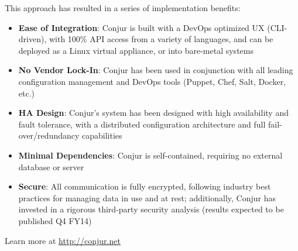 \documentclass[10pt, a5paper]{article}
\begin{document}
This approach has resulted in a series of implementation benefits: 
\begin{itemize}
\item {\bf Ease of Integration}: Conjur is built with a DevOps optimized UX (CLI-driven), with 100\% API access from a variety of langua\-ges, and can be deployed as a Linux virtual appliance, or into bare-metal systems 
\item {\bf No Vendor Lock-In}: Conjur has been used in conjunction with all leading configuration management and DevOps tools (Puppet, Chef, Salt, Docker, etc.) 
\item {\bf HA Design}: Conjur’s system has been designed with high availa\-bility and fault tolerance, with a distributed configuration archi\-tecture and full fail-over/redundancy capabilities 
\item {\bf Minimal Dependencies}: Conjur is self-contained, requiring no external database or server  
\item {\bf Secure}: All communication is fully encrypted, following industry best practices for managing data in use and at rest; additionally, Conjur has invested in a rigorous third-party security analysis (results expected to be published Q4 FY14)
\end{itemize}

Learn more at \url{http://conjur.net}
\end{document}
